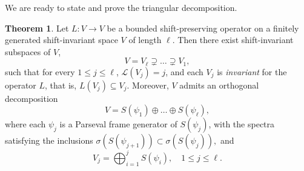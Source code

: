 \documentclass[a4paper,11pt]{amsart}
\theoremstyle{definition}
\newtheorem{teo}[fed]{Theorem}
\theoremstyle{definition}
\def\ele{\mathcal{L}}
\begin{document}
	
	We are ready to state and prove the triangular decomposition.
	
	\begin{teo}\label{triangular}
		Let $L :V\rightarrow V$ be a bounded shift-preserving operator on a finitely generated shift-invariant space $V$ of length $\ell$.
		Then there exist shift-invariant subspaces of $V$, 
		$$
		V=V_\ell\supsetneq \dots\supsetneq V_{1},
		$$ 
		such that for every $1\leq j\leq\ell$,  $\ele(V_j)=j$, and each $V_j$ is \textit{invariant} for the operator $L$, that is, 
		$ L(V_j)\subseteq V_j$. Moreover, $V$ admits an orthogonal decomposition
		$$
		V = S(\psi_1)\oplus \dots \oplus S(\psi_\ell),
		$$
		where each $\psi_j$ is a Parseval frame generator of $S(\psi_j)$,  with the spectra satisfying the inclusions 
		$
		\sigma(S(\psi_{j+1}))\subset \sigma(S(\psi_j)),
		$
		and
		$$
		V_j = \bigoplus_{i=1}^{j} S(\psi_i), \quad 1\leq j \leq \ell.
		$$
	\end{teo}
	
\end{document}
